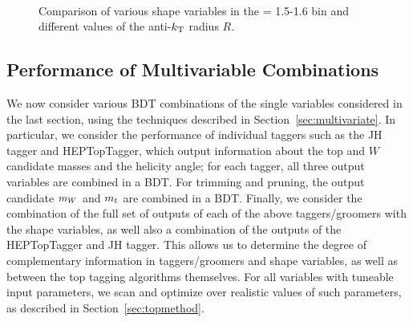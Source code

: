 \begin{figure}
\\
\caption{Comparison of various shape variables in the \pt = 1.5-1.6 \TeV bin and different values of the anti-$k_{\rm T}$ radius $R$.}
\label{fig:C_comparison_R}
\end{figure}


\subsection{Performance of Multivariable Combinations}
We now consider various BDT combinations of the single variables considered in the last section, using the techniques described in Section~\ref{sec:multivariate}. In particular, we consider the performance of individual taggers such as the JH tagger and HEPTopTagger, which output information about the top and $W$ candidate masses and the helicity angle; for each tagger, all three output variables are combined in a BDT. For trimming and pruning, the output candidate $m_{W}$ and $m_{t}$ are combined in a BDT. Finally, we consider the combination of the full set of outputs of each of the above taggers/groomers with the shape variables, as well also a combination of the outputs of the HEPTopTagger and JH tagger. This allows us to determine the degree of complementary information in taggers/groomers and shape variables, as well as between the top tagging algorithms themselves. For all variables with tuneable input parameters, we scan and optimize over realistic values of such parameters, as described in Section~\ref{sec:topmethod}.



